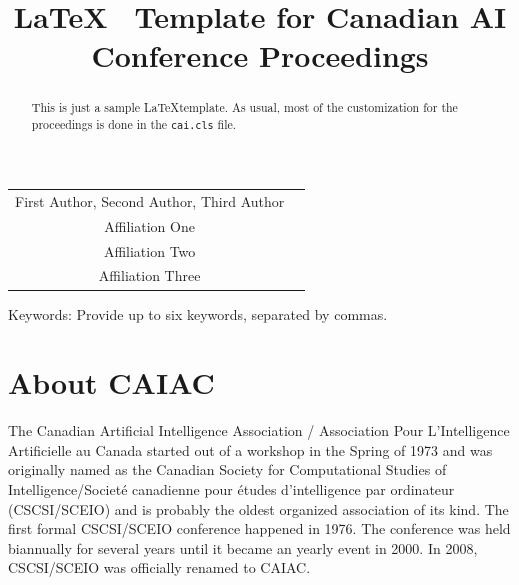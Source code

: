 \documentclass[10pt]{cai}
\begin{document}
\def\conferenceyear{2024}
\begin{center}

\title{\LaTeX~ Template for Canadian AI Conference Proceedings}
\maketitle

\thispagestyle{empty}

\begin{tabular}{cc}
First Author\upstairs{\affilone, *}, Second Author\upstairs{\affilone}, Third Author\upstairs{\affilthree}
\\[0.25ex]
{\small \upstairs{\affilone} Affiliation One} \\
{\small \upstairs{\affiltwo} Affiliation Two} \\
{\small \upstairs{\affilthree} Affiliation Three} \\
\end{tabular}
  
\vspace*{0.2in}
\end{center}

\begin{abstract}
This is just a sample \LaTeX template. As usual, most of the customization for the proceedings is done in the \texttt{cai.cls} file. 
\end{abstract}

\begin{keywords}{Keywords:}
Provide up to six keywords, separated by commas.
\end{keywords}
\copyrightnotice

\section{About CAIAC}

The Canadian Artificial Intelligence Association / Association Pour L'Intelligence Artificielle au Canada started out of a workshop in the Spring of 1973 and was originally named as the Canadian Society for Computational Studies of Intelligence/Societé canadienne pour études d'intelligence par ordinateur (CSCSI/SCEIO) and is probably the oldest organized association of its kind. The first formal CSCSI/SCEIO conference happened in 1976. The conference was held biannually for several years until it became an yearly event in 2000. In 2008, CSCSI/SCEIO was officially renamed to CAIAC.
\end{document}
